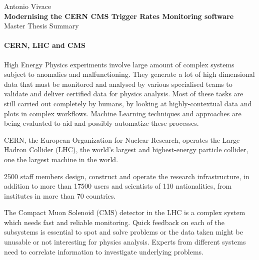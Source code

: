 \documentclass[a4, oneside, 11pt, nobib]{memoir}
\begin{document}
\thispagestyle{empty}

\begin{center}

	{\Large Antonio Vivace}
	\\
	\vspace{8mm}
	{\Huge \textbf{Modernising the CERN CMS Trigger Rates Monitoring software}}
	\\
	\vspace{8mm}
	{\huge Master Thesis Summary}
\end{center}

\pagebreak
\setcounter{page}{1}

		\paragraph{CERN, LHC and CMS} High Energy Physics experiments involve large amount of complex systems subject to anomalies and malfunctioning. They generate a lot of high dimensional data that must be monitored and analysed by various specialised teams to validate and deliver certified data for physics analysis. Most of these tasks are still carried out completely by humans, by looking at highly-contextual data and plots in complex workflows. Machine Learning techniques and approaches are being evaluated to aid and possibly automatize these processes.

		CERN, the European Organization for Nuclear Research, operates the Large Hadron Collider (LHC), the world's largest and highest-energy particle collider, one the largest machine in the world.

		2500 staff members design, construct and operate the research infrastructure, in addition to more than 17500 users and scientists of 110 nationalities, from institutes in more than 70 countries.

		The Compact Muon Solenoid (CMS) detector in the LHC is a complex system which needs fast and reliable monitoring. Quick feedback on each of the subsystems is essential to spot and solve problems or the data taken might be unusable or not interesting for physics analysis. Experts from different systems need to correlate information to investigate underlying problems.
\end{document}
